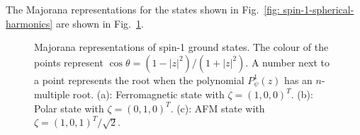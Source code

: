 The Majorana representations for the states shown in
Fig.~\ref{fig: spin-1-spherical-harmonics} are shown in
Fig.~\ref{fig: spin-1-majorana}.
\begin{figure}
    \centering
    \caption[Majorana representation of spin-1 ground states]
    {\label{fig: spin-1-majorana}Majorana representations of spin-1 ground
    states. The colour of the points represent \(\cos\theta =
    (1-|z|^2)/(1+|z|^2)\).
    A number next to a point represents the root when the polynomial
    \(P_\psi^1(z)\) has an \(n\)-multiple root.
    (a): Ferromagnetic state with \(\zeta={(1, 0, 0)}^T\).
    (b): Polar state with \(\zeta={(0, 1, 0)}^T\).
    (c): AFM state with \(\zeta={(1, 0, 1)}^T/\sqrt{2}\).}
\end{figure}

